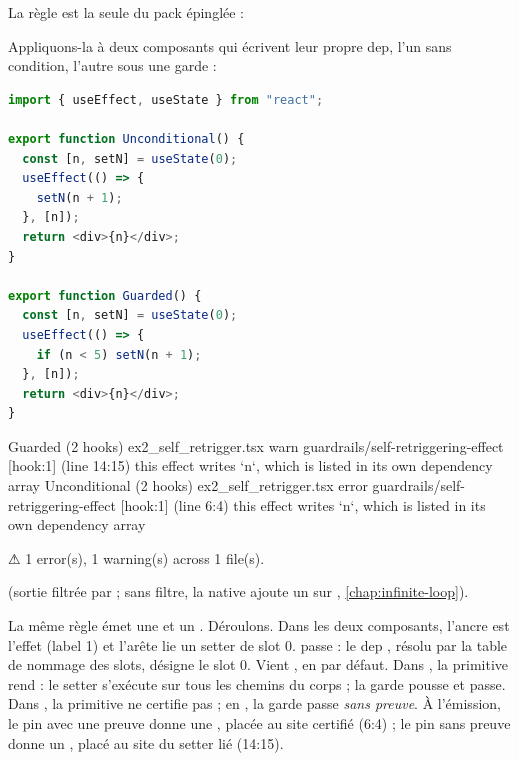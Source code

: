 La règle  est la seule du pack  épinglée  :



Appliquons-la à deux composants qui écrivent leur propre dep, l'un sans condition, l'autre sous une garde :

\begin{lstlisting}[language=TypeScript,caption={Deux effets qui s'auto-relancent (\file{/tmp/ch22/ex2\_self\_retrigger.tsx})},label={lst:decl-ex2}]
import { useEffect, useState } from "react";

export function Unconditional() {
  const [n, setN] = useState(0);
  useEffect(() => {
    setN(n + 1);
  }, [n]);
  return <div>{n}</div>;
}

export function Guarded() {
  const [n, setN] = useState(0);
  useEffect(() => {
    if (n < 5) setN(n + 1);
  }, [n]);
  return <div>{n}</div>;
}
\end{lstlisting}

\begin{sortie}
  Guarded  (2 hooks)  ex2_self_retrigger.tsx
    warn   guardrails/self-retriggering-effect  [hook:1]  (line 14:15)  this effect writes `n`, which is listed in its own dependency array
  Unconditional  (2 hooks)  ex2_self_retrigger.tsx
    error  guardrails/self-retriggering-effect  [hook:1]  (line 6:4)  this effect writes `n`, which is listed in its own dependency array

⚠  1 error(s), 1 warning(s) across 1 file(s).
\end{sortie}
(sortie filtrée par  ; sans filtre, la native  ajoute un \Warning{} sur , \cref{chap:infinite-loop}).

La même règle émet une \Error{} et un \Warning{}. Déroulons. Dans les deux composants, l'ancre est l'effet (label 1) et l'arête  lie un setter  de slot 0.  passe : le dep , résolu par la table de nommage des slots, désigne le slot 0. Vient , en  par défaut. Dans , la primitive rend  : le setter s'exécute sur tous les chemins du corps ; la garde pousse  et passe. Dans , la primitive ne certifie pas ; en , la garde passe \emph{sans preuve}. À l'émission, le pin  avec une preuve donne une \Error{}, placée au site certifié  (6:4) ; le pin  sans preuve donne un \Warning{}, placé au site du setter lié (14:15).

